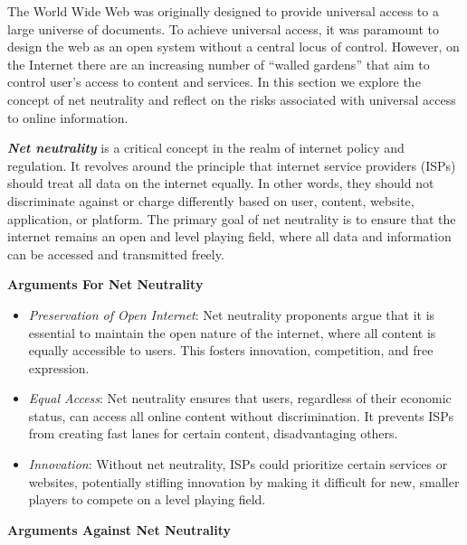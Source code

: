 \documentclass[
]{book}
\providecommand{\tightlist}{%
  \setlength{\itemsep}{0pt}\setlength{\parskip}{0pt}}
\theoremstyle{definition}
\theoremstyle{definition}
\theoremstyle{definition}
\theoremstyle{definition}
\theoremstyle{remark}
\begin{document}
The World Wide Web was originally designed to provide universal access to a large universe of documents. To achieve universal access, it was paramount to design the web as an open system without a central locus of control. However, on the Internet there are an increasing number of ``walled gardens'' that aim to control user's access to content and services. In this section we explore the concept of net neutrality and reflect on the risks associated with universal access to online information.

\textbf{\emph{Net neutrality}} is a critical concept in the realm of internet policy and regulation. It revolves around the principle that internet service providers (ISPs) should treat all data on the internet equally. In other words, they should not discriminate against or charge differently based on user, content, website, application, or platform. The primary goal of net neutrality is to ensure that the internet remains an open and level playing field, where all data and information can be accessed and transmitted freely.

\textbf{Arguments For Net Neutrality}

\begin{itemize}
\tightlist
\item
  \emph{Preservation of Open Internet}: Net neutrality proponents argue that it is essential to maintain the open nature of the internet, where all content is equally accessible to users. This fosters innovation, competition, and free expression.\\
\item
  \emph{Equal Access}: Net neutrality ensures that users, regardless of their economic status, can access all online content without discrimination. It prevents ISPs from creating fast lanes for certain content, disadvantaging others.\\
\item
  \emph{Innovation}: Without net neutrality, ISPs could prioritize certain services or websites, potentially stifling innovation by making it difficult for new, smaller players to compete on a level playing field.
\end{itemize}

\textbf{Arguments Against Net Neutrality}
\end{document}
